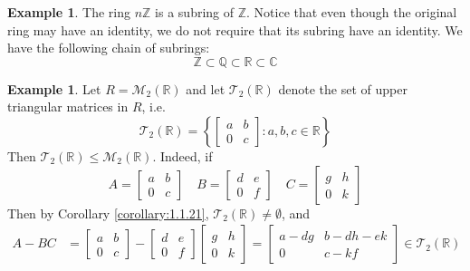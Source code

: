 \documentclass[11pt]{book}
\theoremstyle{definition}\newtheorem{definition}[subsection]{Definition}
\theoremstyle{definition}\newtheorem{example}[subsection]{Example}
\theoremstyle{definition}\newtheorem{notation}[subsection]{Notation}
\theoremstyle{definition}\newtheorem{remark}[subsection]{Remark}
\theoremstyle{theorem}\newtheorem{theorem}[subsection]{Theorem}
\theoremstyle{theorem}\newtheorem{lemma}[subsection]{Lemma}
\theoremstyle{theorem}\newtheorem{proposition}[subsection]{Proposition}
\theoremstyle{theorem}\newtheorem{corollary}[subsection]{Corollary}
\newcommand{\C}{\mathbb{C}}
\newcommand{\R}{\mathbb{R}}
\newcommand{\Q}{\mathbb{Q}}
\newcommand{\Z}{\mathbb{Z}}
\newcommand{\M}{\mathcal{M}}
\newcommand{\TT}{\mathcal{T}}
\begin{document}

\begin{example}\label{example:1.1.22}
    The ring $n\Z$ is a subring of $\Z$. Notice that even though the original ring may have an identity, we do not require that its subring have an identity. We have the following chain of subrings:
    \begin{equation*}
        \Z \subset \Q \subset \R \subset \C
    \end{equation*}
\end{example}

\begin{example}\label{example:1.1.23}
    Let $R = \M_2(\R)$ and let $\TT_2(\R)$ denote the set of upper triangular matrices in $R$, i.e.
    \begin{equation*}
        \TT_2(\R) = \left\{\begin{bmatrix} a & b \\ 0 & c \end{bmatrix} : a, b, c \in \R\right\}
    \end{equation*}
    Then $\TT_2(\R) \leq \M_2(\R)$. Indeed, if
    \begin{equation*}
        A = \begin{bmatrix}
            a & b \\ 0 & c
        \end{bmatrix} \quad
        B = \begin{bmatrix}
            d & e \\ 0 & f
        \end{bmatrix} \quad
        C = \begin{bmatrix}
            g & h \\ 0 & k
        \end{bmatrix}
    \end{equation*}
    Then by Corollary \ref{corollary:1.1.21}, $\TT_2(\R) \neq \emptyset$, and
    \begin{align*}
        A - BC &= \begin{bmatrix}
            a & b \\ 0 & c
        \end{bmatrix} - \begin{bmatrix}
            d & e \\ 0 & f
        \end{bmatrix}\begin{bmatrix}
            g & h \\ 0 & k
        \end{bmatrix} = \begin{bmatrix}
            a - dg & b - dh - ek \\
            0 & c - kf
        \end{bmatrix} \in \TT_2(\R)
    \end{align*}
\end{example}
\end{document}
